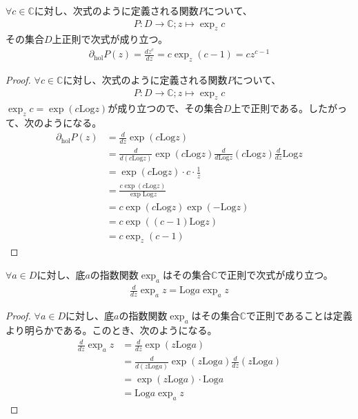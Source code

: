 \documentclass[dvipdfmx]{jsarticle}
\begin{document}
\begin{thm}\label{4.3.3.12}
$\forall c \in \mathbb{C}$に対し、次式のように定義される関数$P$について、
\begin{align*}
P:D \rightarrow \mathbb{C};z \mapsto \exp_{z}c
\end{align*}
その集合$D$上正則で次式が成り立つ。
\begin{align*}
  \partial_{\mathrm{hol}}P(z) = \frac{dz^{c}}{dz} = c\exp_{z}(c - 1) = cz^{c - 1}
\end{align*}
\end{thm}
\begin{proof}
$\forall c \in \mathbb{C}$に対し、次式のように定義される関数$P$について、
\begin{align*}
P:D \rightarrow \mathbb{C};z \mapsto \exp_{z}c
\end{align*}
$\exp_{z}c = \exp\left( c\mathrm{Log}z \right)$が成り立つので、その集合$D$上で正則である。したがって、次のようになる。
\begin{align*}
\partial_{\mathrm{hol}}P(z) &= \frac{d}{dz}\exp\left( c\mathrm{Log}z \right)\\
&= \frac{d}{d\left( c\mathrm{Log}z \right)}\exp\left( c\mathrm{Log}z \right)\frac{d}{d\mathrm{Log}z}\left( c\mathrm{Log}z \right)\frac{d}{dz}\mathrm{Log}z\\
&= \exp\left( c\mathrm{Log}z \right) \cdot c \cdot \frac{1}{z}\\
&= \frac{c\exp\left( c\mathrm{Log}z \right)}{\exp{\mathrm{Log}z}}\\
&= c\exp\left( c\mathrm{Log}z \right)\exp\left( - \mathrm{Log}z \right)\\
&= c\exp\left( (c - 1)\mathrm{Log}z \right)\\
&= c\exp_{z}(c - 1)
\end{align*}
\end{proof}
\begin{thm}\label{4.3.3.13}
$\forall a \in D$に対し、底$a$の指数関数$\exp_{a}$はその集合$\mathbb{C}$で正則で次式が成り立つ。
\begin{align*}
\frac{d}{dz}\exp_{a}z = \mathrm{Log}a\exp_{a}z
\end{align*}
\end{thm}
\begin{proof}
$\forall a \in D$に対し、底$a$の指数関数$\exp_{a}$はその集合$\mathbb{C}$で正則であることは定義より明らかである。このとき、次のようになる。
\begin{align*}
\frac{d}{dz}\exp_{a}z &= \frac{d}{dz}\exp\left( z\mathrm{Log}a \right)\\
&= \frac{d}{d\left( z\mathrm{Log}a \right)}\exp\left( z\mathrm{Log}a \right)\frac{d}{dz}\left( z\mathrm{Log}a \right)\\
&= \exp\left( z\mathrm{Log}a \right) \cdot \mathrm{Log}a\\
&= \mathrm{Log}a\exp_{a}z
\end{align*}
\end{proof}
\end{document}
